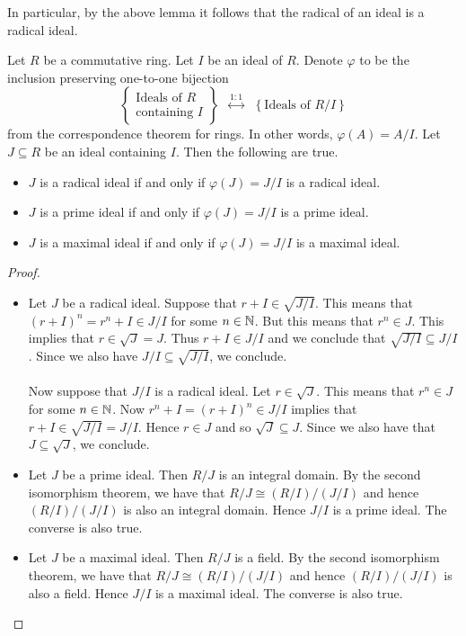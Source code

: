 \documentclass[a4paper]{article}
\begin{document}
In particular, by the above lemma it follows that the radical of an ideal is a radical ideal. 

\begin{thm}{}{} Let $R$ be a commutative ring. Let $I$ be an ideal of $R$. Denote $\varphi$ to be the inclusion preserving one-to-one bijection $$\left\{\substack{\text{Ideals of }R\\\text{containing }I}\right\}\;\;\overset{1:1}{\longleftrightarrow}\;\;\left\{\text{Ideals of }R/I\right\}$$ from the correspondence theorem for rings. In other words, $\varphi(A)=A/I$. Let $J\subseteq R$ be an ideal containing $I$. Then the following are true. 
\begin{itemize}
\item $J$ is a radical ideal if and only if $\varphi(J)=J/I$ is a radical ideal. 
\item $J$ is a prime ideal if and only if $\varphi(J)=J/I$ is a prime ideal. 
\item $J$ is a maximal ideal if and only if $\varphi(J)=J/I$ is a maximal ideal. 
\end{itemize} \tcbline
\begin{proof}~\\
\begin{itemize}
\item Let $J$ be a radical ideal. Suppose that $r+I\in\sqrt{J/I}$. This means that $(r+I)^n=r^n+I\in J/I$ for some $n\in\mathbb{N}$. But this means that $r^n\in J$. This implies that $r\in\sqrt{J}=J$. Thus $r+I\in J/I$ and we conclude that $\sqrt{J/I}\subseteq J/I$. Since we also have $J/I\subseteq\sqrt{J/I}$, we conclude. \\~\\

Now suppose that $J/I$ is a radical ideal. Let $r\in\sqrt{J}$. This means that $r^n\in J$ for some $n\in\mathbb{N}$. Now $r^n+I=(r+I)^n\in J/I$ implies that $r+I\in\sqrt{J/I}=J/I$. Hence $r\in J$ and so $\sqrt{J}\subseteq J$. Since we also have that $J\subseteq\sqrt{J}$, we conclude. 

\item Let $J$ be a prime ideal. Then $R/J$ is an integral domain. By the second isomorphism theorem, we have that $R/J\cong(R/I)/(J/I)$ and hence $(R/I)/(J/I)$ is also an integral domain. Hence $J/I$ is a prime ideal. The converse is also true. 

\item Let $J$ be a maximal ideal. Then $R/J$ is a field. By the second isomorphism theorem, we have that $R/J\cong(R/I)/(J/I)$ and hence $(R/I)/(J/I)$ is also a field. Hence $J/I$ is a maximal ideal. The converse is also true. 
\end{itemize}
\end{proof}
\end{thm}
\end{document}
